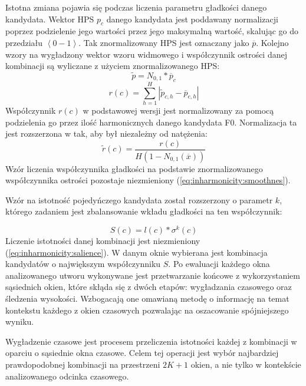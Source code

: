 \documentclass[12pt,a4paper,twoside]{mwart}
\begin{document}
Istotna zmiana pojawia się podczas liczenia parametru gładkości danego kandydata. Wektor HPS $p_c$ danego kandydata jest poddawany normalizacji poprzez podzielenie jego wartości przez jego maksymalną wartość, skalując go do przedziału $\left<0-1\right>$. Tak znormalizowany HPS jest oznaczany jako $\overline{p}$. Kolejno wzory na wygładzony wektor wzoru widmowego i współczynnik ostrości danej kombinacji są wyliczane z użyciem znormalizowanego HPS:
\begin{equation}\label{eq:inharmonicity2:hpsSmoothed}
  \widetilde{p} = N_{0,1}\ast \overline{p}_c 
\end{equation}
\begin{equation}\label{eq:inharmonicity2:sharpness}
  r(c) = \sum_{h=1}^H\left|\widetilde{p}_{c,h} - \overline{p}_{c,h} \right|
\end{equation}
Współczynnik $r(c)$ w podstawowej wersji jest normalizowany za pomocą podzielenia go przez ilość harmonicznych danego kandydata F0. Normalizacja ta jest rozszerzona w 
\cite[5-6]{Transcription:Pertus:Inharmonicity2} 
tak, aby był niezależny od natężenia:
\begin{equation}\label{eq:inharmonicity2:roughness}
  \widetilde{r}(c) = \frac{r(c)}{H(1 - N_{0, 1}(\overline{x}))}
\end{equation}
Wzór liczenia współczynnika gładkości na podstawie znormalizowanego współczynnika ostrości pozostaje niezmieniony (\ref{eq:inharmonicity:smoothnes}).

Wzór na istotność pojedyńczego kandydata został rozszerzony o parametr $k$, którego zadaniem jest zbalansowanie wkładu gładkości na ten współczynnik:

\begin{equation}\label{eq:inharmonicity2:salience}
S(c) = l(c) * \sigma^k(c)
\end{equation}
Liczenie istotności danej kombinacji jest niezmieniony (\ref{eq:inharmonicity:salience}). W danym oknie wybierana jest kombinacja kandydatów o największym współczynniku $S$. Po ewaluacji każdego okna analizowanego utworu wykonywane jest przetwarzanie końcowe z wykorzystaniem sąsiednich okien, które skłąda się z dwóch etapów: wygładzania czasowego oraz śledzenia wysokości. Wzbogacają one omawianą metodę o informację na temat kontekstu każdego z okien czasowych pozwalając na oszacowanie spójniejszego wyniku.

Wygładzenie czasowe jest procesem przeliczenia istotności każdej z kombinacji w oparciu o sąsiednie okna czasowe. Celem tej operacji jest wybór najbardziej prawdopodobnej kombinacji na przestrzeni $2K + 1$ okien, a nie tylko w kontekście analizowanego odcinka czasowego.
\end{document}
